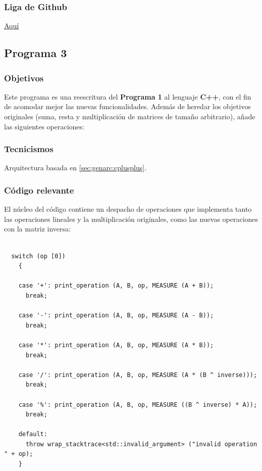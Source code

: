 \documentclass{article}[12pt,a4paper]
\begin{document}
\subsubsection{Liga de \textbf{Github}}

\href{https://github.com/MarcosHCK/master-programming/tree/master/claseb}{Aquí \faGithubSquare}

\subsection{Programa 3}

\subsubsection{Objetivos}

Este programa es una reescritura del \textbf{Programa 1} al lenguaje \textbf{C++}, con el fin de acomodar mejor las nuevas funcionalidades. Además de heredar los objetivos originales (suma, resta y multiplicación de matrices de tamaño arbitrario), añade las siguientes operaciones:


\subsubsection{Tecnicismos}

Arquitectura basada en \ref{sec:genarc:cplusplus}.

\subsubsection{Código relevante}

El núcleo del código contiene un despacho de operaciones que implementa tanto las operaciones lineales y la multiplicación originales, como las nuevas operaciones con la matriz inversa:

\begin{verbatim}

  switch (op [0])
    {

    case '+': print_operation (A, B, op, MEASURE (A + B));
      break;

    case '-': print_operation (A, B, op, MEASURE (A - B));
      break;

    case '*': print_operation (A, B, op, MEASURE (A * B));
      break;

    case '/': print_operation (A, B, op, MEASURE (A * (B ^ inverse)));
      break;

    case '%': print_operation (A, B, op, MEASURE ((B ^ inverse) * A));
      break;

    default:
      throw wrap_stacktrace<std::invalid_argument> ("invalid operation " + op);
    }
\end{verbatim}
\end{document}
